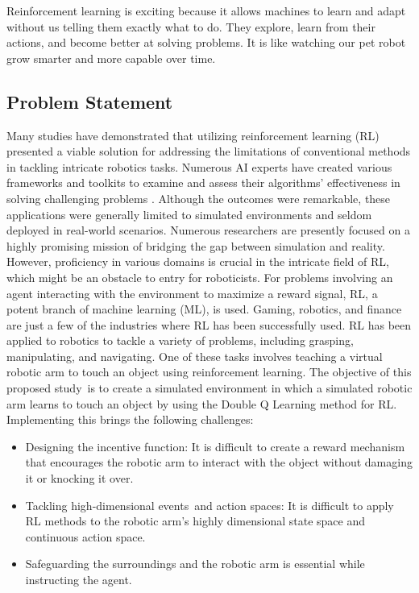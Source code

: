 \documentclass[12pt,oneside]{article}
\begin{document}
Reinforcement learning is exciting because it allows machines to learn and adapt without us telling them exactly what to do. They explore, learn from their actions, and become better at solving problems. It is like watching our pet robot grow smarter and more capable over time.

\subsection{Problem Statement}

Many studies have demonstrated that utilizing reinforcement learning (RL) presented a viable solution for addressing the limitations of conventional methods in tackling intricate robotics tasks. Numerous AI experts have created various frameworks and toolkits to examine and assess their algorithms' effectiveness in solving challenging problems \cite{36_wu2020ethical}. Although the outcomes were remarkable, these applications were generally limited to simulated environments and seldom deployed in real-world scenarios. Numerous researchers are presently focused on a highly promising mission of bridging the gap between simulation and reality. However, proficiency in various domains is crucial in the intricate field of RL, which might be an obstacle to entry for roboticists.
For problems involving an agent interacting with the environment to maximize a reward signal, RL, a potent branch of machine learning (ML), is used. Gaming, robotics, and finance are just a few of the industries where RL has been successfully used. RL has been applied to robotics to tackle a variety of problems, including grasping, manipulating, and navigating. One of these tasks involves teaching a virtual robotic arm to touch an object using reinforcement learning.
The objective of this proposed study is to create a simulated environment in which a simulated robotic arm learns to touch an object by using the Double Q Learning method for RL. Implementing this brings the following challenges:
\begin{itemize}
\item Designing the incentive function: It is difficult to create a reward mechanism that encourages the robotic arm to interact with the object without damaging it or knocking it over.
\item Tackling high-dimensional events and action spaces: It is difficult to apply RL methods to the robotic arm's highly dimensional state space and continuous action space.
\item Safeguarding the surroundings and the robotic arm is essential while instructing the agent.
\end{itemize}
\end{document}
